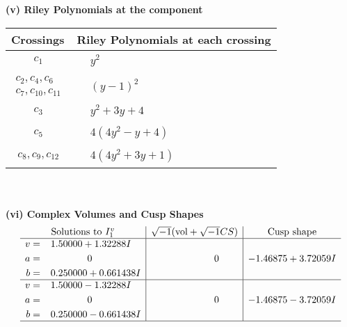 \documentclass[1p]{elsarticle_modified}
\theoremstyle{definition}
\newcommand{\I}{\sqrt{-1}}
\begin{document}
\newpage\renewcommand{\arraystretch}{1}
\flushleft \textbf{(v) Riley Polynomials at the component}\newline \\
\begin{tabular}{m{50pt}|m{274pt}}
Crossings & \hspace{64pt}Riley Polynomials at each crossing \\
\hline $$\begin{aligned}c_{1}\end{aligned}$$&$\begin{aligned}
&y^2
\end{aligned}$\\
\hline $$\begin{aligned}c_{2},c_{4},c_{6}\\c_{7},c_{10},c_{11}\end{aligned}$$&$\begin{aligned}
&(y-1)^2
\end{aligned}$\\
\hline $$\begin{aligned}c_{3}\end{aligned}$$&$\begin{aligned}
&y^2+3 y+4
\end{aligned}$\\
\hline $$\begin{aligned}c_{5}\end{aligned}$$&$\begin{aligned}
&4(4 y^2- y+4)
\end{aligned}$\\
\hline $$\begin{aligned}c_{8},c_{9},c_{12}\end{aligned}$$&$\begin{aligned}
&4(4 y^2+3 y+1)
\end{aligned}$\\
\hline
\end{tabular}\\~\\
\newpage\flushleft \textbf{(vi) Complex Volumes and Cusp Shapes}
$$\begin{array}{c|c|c}  
\text{Solutions to }I^v_{1}& \I (\text{vol} + \sqrt{-1}CS) & \text{Cusp shape}\\
 \hline 
\begin{aligned}
v &= \phantom{-}1.50000 + 1.32288 I \\
a &= \phantom{-0.000000 } 0 \\
b &= \phantom{-}0.250000 + 0.661438 I\end{aligned}
 & \phantom{-0.000000 } 0 & -1.46875 + 3.72059 I \\ \hline\begin{aligned}
v &= \phantom{-}1.50000 - 1.32288 I \\
a &= \phantom{-0.000000 } 0 \\
b &= \phantom{-}0.250000 - 0.661438 I\end{aligned}
 & \phantom{-0.000000 } 0 & -1.46875 - 3.72059 I\\
 \hline 
 \end{array}$$\newpage
\end{document}
